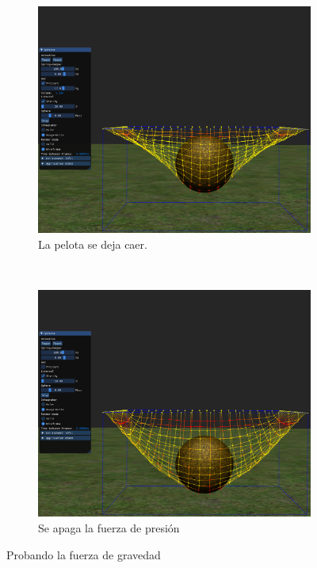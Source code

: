 \begin{figure}
\begin{subfigure}[b]{0.45\textwidth}
  \end{subfigure}
\\
  \begin{subfigure}[b]{0.45\textwidth}
    \includegraphics[width=\textwidth]{Img/04/gravity3}
    \caption{La pelota se deja caer.}
    \label{fig:testGCae}
  \end{subfigure}
~
  \begin{subfigure}[b]{0.45\textwidth}
    \includegraphics[width=\textwidth]{Img/04/gravity4}
    \caption{Se apaga la fuerza de presión}
    \label{fig:testGNoPres}
  \end{subfigure}
 \caption[Experimento: Fuerza de gravedad]{Probando la fuerza de gravedad} 
 \label{fig:testGravity}
\end{figure}

